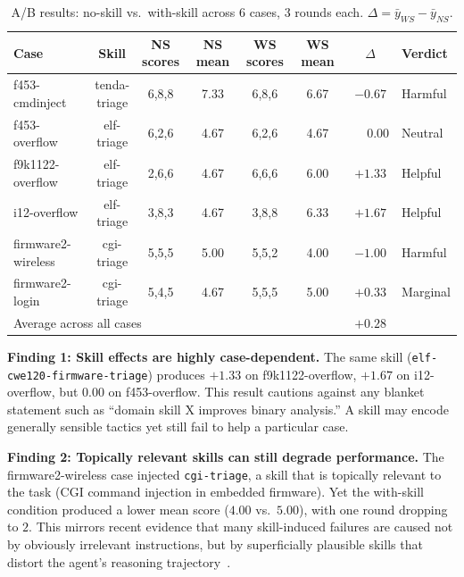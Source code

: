 ﻿\documentclass[preprint,12pt]{elsarticle}
\begin{document}
\begin{table}[t]
\centering
\caption{A/B results: no-skill vs.\ with-skill across 6 cases, 3 rounds each.
$\Delta = \bar{y}_{WS} - \bar{y}_{NS}$.}
\label{tab:ab_results}
\footnotesize
\begin{tabular}{l c c c c c c l}
\toprule
Case & Skill & \makecell[c]{NS\\scores} & NS mean & \makecell[c]{WS\\scores} & WS mean & $\Delta$ & Verdict \\
\midrule
f453-cmdinject & \makecell[l]{tenda-\\triage} & 6,8,8 & 7.33 & 6,8,6 & 6.67 & $-0.67$ & Harmful \\
f453-overflow & \makecell[l]{elf-\\triage} & 6,2,6 & 4.67 & 6,2,6 & 4.67 & $\phantom{-}0.00$ & Neutral \\
f9k1122-overflow & \makecell[l]{elf-\\triage} & 2,6,6 & 4.67 & 6,6,6 & 6.00 & $+1.33$ & Helpful \\
i12-overflow & \makecell[l]{elf-\\triage} & 3,8,3 & 4.67 & 3,8,8 & 6.33 & $+1.67$ & Helpful \\
\makecell[l]{firmware2-\\wireless} & \makecell[l]{cgi-\\triage} & 5,5,5 & 5.00 & 5,5,2 & 4.00 & $-1.00$ & Harmful \\
\makecell[l]{firmware2-\\login} & \makecell[l]{cgi-\\triage} & 5,4,5 & 4.67 & 5,5,5 & 5.00 & $+0.33$ & Marginal \\
\midrule
\multicolumn{5}{l}{Average across all cases} &  & $+0.28$ &  \\
\bottomrule
\end{tabular}
\end{table}

\textbf{Finding 1: Skill effects are highly case-dependent.}
The same skill (\texttt{elf-cwe120-firmware-triage}) produces $+1.33$ on
f9k1122-overflow, $+1.67$ on i12-overflow, but $0.00$ on f453-overflow.
This result cautions against any blanket statement such as ``domain skill X
improves binary analysis.''  A skill may encode generally sensible tactics
yet still fail to help a particular case.

\textbf{Finding 2: Topically relevant skills can still degrade
performance.}
The firmware2-wireless case injected \texttt{cgi-triage}, a
skill that is topically relevant to the task (CGI command injection in
embedded firmware).  Yet the with-skill condition produced a lower mean
score ($4.00$ vs.\ $5.00$), with one round dropping to $2$.  This mirrors
recent evidence that many skill-induced failures are caused not by
obviously irrelevant instructions, but by superficially plausible skills
that distort the agent's reasoning trajectory~\cite{skillharmful}.
\end{document}
